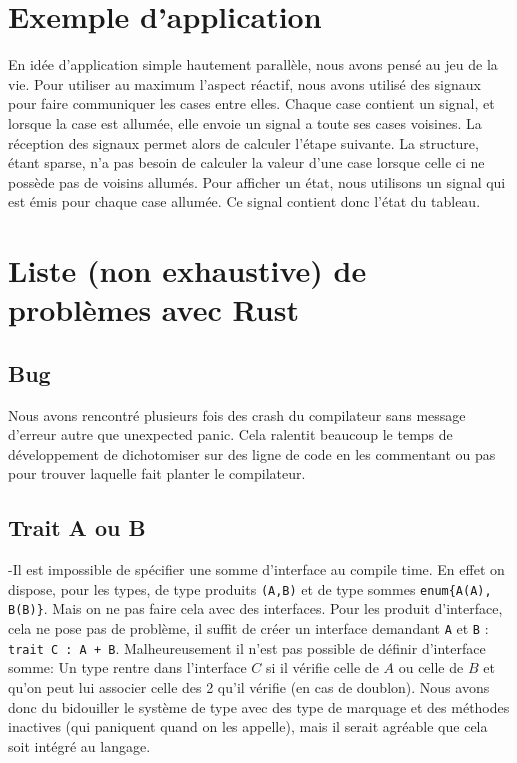 \documentclass[a4paper]{article}
\renewcommand{\(}{\left(}
\renewcommand{\)}{\right)}
\begin{document}
\section{Exemple d'application}

En idée d'application simple hautement parallèle, nous avons pensé au jeu de la
vie. Pour utiliser au maximum l'aspect réactif, nous avons utilisé des signaux
pour faire communiquer les cases entre elles. Chaque case contient un signal, et
lorsque la case est allumée, elle envoie un signal a toute ses cases voisines.
La réception des signaux permet alors de calculer l'étape suivante. La
structure, étant sparse, n'a pas besoin de calculer la valeur d'une case lorsque
celle ci ne possède pas de voisins allumés. Pour afficher un état, nous
utilisons un signal qui est émis pour chaque case allumée. Ce signal contient
donc l'état du tableau.

\section{Liste (non exhaustive) de problèmes avec Rust}
\subsection{Bug}
Nous avons rencontré plusieurs fois des crash du compilateur sans message d'erreur
autre que \og unexpected panic\fg{}. Cela ralentit beaucoup le temps de
développement de dichotomiser sur des ligne de code en les commentant ou pas
pour trouver laquelle fait planter le compilateur.


\subsection{Trait A ou B}
-Il est impossible de spécifier une somme d'interface au compile time. En effet
on dispose, pour les types, de type produits \verb!(A,B)! et de type sommes
\verb!enum{A(A), B(B)}!. Mais on ne pas faire cela avec des interfaces. Pour les
produit d'interface, cela ne pose pas de problème, il suffit de créer un
interface demandant \verb!A! et \verb!B! : \verb!trait C : A + B!.
Malheureusement il n'est pas possible de définir d'interface somme: Un type
rentre dans l'interface $C$ si il vérifie celle de $A$ ou celle de $B$ et qu'on
peut lui associer celle des 2 qu'il vérifie (en cas de doublon). Nous avons donc du
bidouiller le système de type avec des type de marquage et des méthodes
inactives (qui paniquent quand on les appelle), mais il serait agréable
que cela soit intégré au langage.
\end{document}
